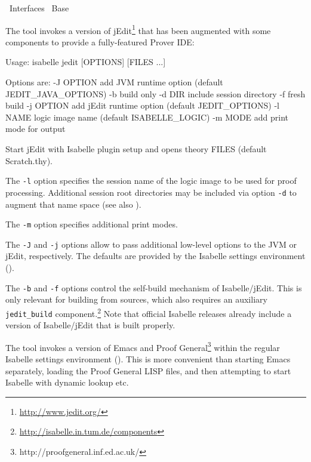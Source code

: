 %
\begin{isabellebody}%
\def\isabellecontext{Interfaces}%
%
\isadelimtheory
%
\endisadelimtheory
%
\isatagtheory
{}\isamarkupfalse%
\ Interfaces\isanewline
{}\ Base\isanewline
{}%
\endisatagtheory
{\isafoldtheory}%
%
\isadelimtheory
%
\endisadelimtheory
%
\isamarkuptrue%
%
\isamarkuptrue%
%
\begin{isamarkuptext}%
The \hypertarget{tool.jedit}{\hyperlink{tool.jedit}{\mbox{}}} tool invokes a version of
  jEdit\footnote{\url{http://www.jedit.org/}} that has been augmented
  with some components to provide a fully-featured Prover IDE:
\begin{ttbox} Usage: isabelle jedit [OPTIONS]
  [FILES ...]

  Options are:
    -J OPTION    add JVM runtime option (default JEDIT_JAVA_OPTIONS)
    -b           build only
    -d DIR       include session directory
    -f           fresh build
    -j OPTION    add jEdit runtime option (default JEDIT_OPTIONS)
    -l NAME      logic image name (default ISABELLE_LOGIC)
    -m MODE      add print mode for output

Start jEdit with Isabelle plugin setup and opens theory FILES
(default Scratch.thy).
\end{ttbox}

  The \verb|-l| option specifies the session name of the logic
  image to be used for proof processing.  Additional session root
  directories may be included via option \verb|-d| to augment
  that name space (see also ).

  The \verb|-m| option specifies additional print modes.

  The \verb|-J| and \verb|-j| options allow to pass
  additional low-level options to the JVM or jEdit, respectively.  The
  defaults are provided by the Isabelle settings environment
  ().

  The \verb|-b| and \verb|-f| options control the
  self-build mechanism of Isabelle/jEdit.  This is only relevant for
  building from sources, which also requires an auxiliary \verb|jedit_build|
  component.\footnote{\url{http://isabelle.in.tum.de/components}} Note
  that official Isabelle releases already include a version of
  Isabelle/jEdit that is built properly.%
\end{isamarkuptext}%
\isamarkuptrue%
%
\isamarkuptrue%
%
\begin{isamarkuptext}%
The \hypertarget{tool.emacs}{\hyperlink{tool.emacs}{\mbox{}}} tool invokes a version of Emacs and
  Proof General\footnote{http://proofgeneral.inf.ed.ac.uk/} within the
  regular Isabelle settings environment ().  This
  is more convenient than starting Emacs separately, loading the Proof
  General LISP files, and then attempting to start Isabelle with
  dynamic \hyperlink{setting.PATH}{\mbox{}} lookup etc.


\end{isamarkuptext}
\end{isabellebody}
